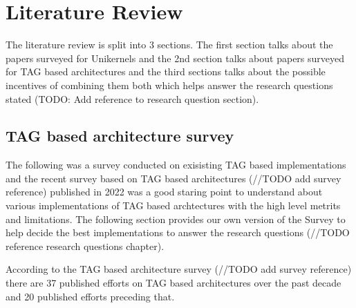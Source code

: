 
\chapter{Literature Review}  %

\ifpdf
    \graphicspath{{LiteratureReview/Figs/Raster/}{LiteratureReview/Figs/PDF/}{LiteratureReview/Figs/}}
\else
    \graphicspath{{LiteratureReview/Figs/Vector/}{LiteratureReview/Figs/}}
\fi


The literature review is split into 3 sections. The first section talks about the papers surveyed 
for Unikernels and the 2nd section talks about papers surveyed for TAG based architectures and 
the third sections talks about the possible incentives of combining them both which helps 
answer the research questions stated (TODO: Add reference to research question section). 

\section[TAG based architecture survey]{TAG based architecture survey}   
The following was a survey conducted on exisisting TAG based implementations and the 
recent survey based on TAG based architectures (//TODO add survey reference) published
in 2022 was a good staring point to understand about various implementations of TAG
based archtectures with the high level metrits and limitations. The following section 
provides our own version of the Survey to help decide the best implementations 
to answer the research questions (//TODO reference research questions chapter). 
 
According to the TAG based architecture survey (//TODO add survey reference) there are 37 published
efforts on TAG based architectures over the past decade and 20 published efforts preceding that. 

